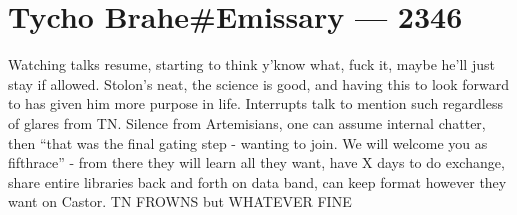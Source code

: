 \hypertarget{tycho-braheemissary-2346}{%
\chapter{Tycho Brahe\#Emissary — 2346}\label{tycho-braheemissary-2346}}

Watching talks resume, starting to think y'know what, fuck it, maybe he'll just stay if allowed. Stolon's neat, the science is good, and having this to look forward to has given him more purpose in life. Interrupts talk to mention such regardless of glares from TN. Silence from Artemisians, one can assume internal chatter, then ``that was the final gating step - wanting to join. We will welcome you as fifthrace'' - from there they will learn all they want, have X days to do exchange, share entire libraries back and forth on data band, can keep format however they want on Castor. TN FROWNS but WHATEVER FINE
